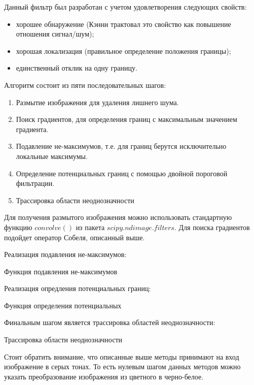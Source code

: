 Данный фильтр\cite{Canny} был разработан с учетом удовлетворения следующих свойств:
\begin{itemize}
	\item хорошее обнаружение (Кэнни трактовал это свойство как повышение отношения сигнал/шум);
	\item хорошая локализация (правильное определение положения границы);
	\item единственный отклик на одну границу.
\end{itemize}

Алгоритм состоит из пяти последовательных шагов:
\begin{enumerate}
	\item Размытие изображения для удаления лишнего шума.
	\item Поиск градиентов, для определения границ с максимальным значением градиента.
	\item Подавление не-максимумов, т.е. для границ берутся исключительно локальные максимумы.
	\item Определение потенциальных границ с помощью двойной пороговой фильтрации.
	\item Трассировка области неоднозначности
\end{enumerate}

Для получения размытого изображения можно использовать стандартную функцию $convolve()$ из пакета $scipy.ndimage.filters$. Для поиска градиентов подойдет оператор Собеля, описанный выше. 

Реализация подавления не-максимумов:

\begin{minipage}{0.75\textwidth}
	\begin{algorithm}[H]
		
		\caption{Функция подавления не-максимумов}
		\label{imp:canny-non-max}
	\end{algorithm}
\end{minipage}

Реализация опредления потенциальных границ:

\begin{minipage}{0.75\textwidth}
	\begin{algorithm}[H]
		
		\caption{Функция определения потенциальных}
		\label{imp:canny-threholding}
	\end{algorithm}
\end{minipage}

Финальным шагом является трассировка областей неоднозначности:

\begin{minipage}{0.75\textwidth}
	\begin{algorithm}[H]
		
		\caption{Трассировка области неоднозначности}
		\label{imp:canny-hysteresis}
	\end{algorithm}
\end{minipage}

Стоит обратить внимание, что описанные выше методы принимают на вход изображение в серых тонах. То есть нулевым шагом данных методов можно указать преобразование изображения из цветного в черно-белое.
